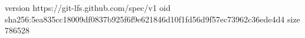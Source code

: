 version https://git-lfs.github.com/spec/v1
oid sha256:5ea835cc18009df0837b925f6f9e621846d10f1fd56d9f57ec73962c36ede4d4
size 786528
